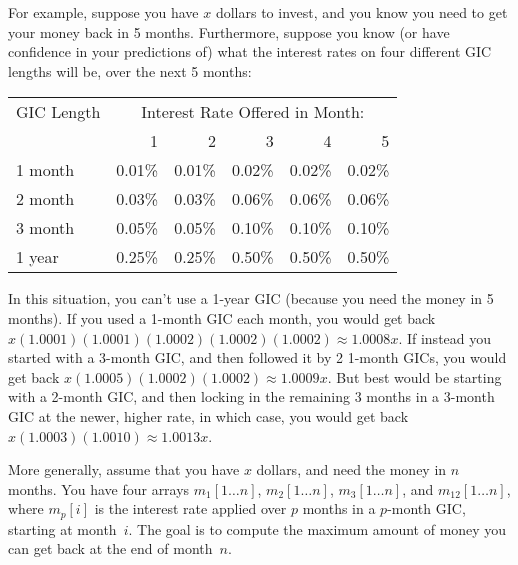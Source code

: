 \documentclass[11pt]{article}
\begin{document}
For example, suppose you have $x$ dollars to invest, and you know you need to
get your money back in 5 months.  Furthermore,
suppose you know (or have confidence in your predictions of) what
the interest rates on four different GIC lengths will be, over the next
5 months:
\begin{center}
\begin{tabular}{l||r|r|r|r|r}
GIC Length & \multicolumn{5}{c}{Interest Rate Offered in Month:} \\
	\cline{2-6}
 & 1 & 2 & 3 & 4 & 5 \\
 \hline
 \hline
1 month & 0.01\% & 0.01\% & 0.02\% & 0.02\% & 0.02\% \\
\hline
2 month & 0.03\% & 0.03\% & 0.06\% & 0.06\% & 0.06\% \\
\hline
3 month & 0.05\% & 0.05\% & 0.10\% & 0.10\% & 0.10\% \\
\hline
1 year & 0.25\% & 0.25\% & 0.50\% & 0.50\% & 0.50\% \\
\hline
\end{tabular}
\end{center}
In this situation, you can't use a 1-year GIC (because you need the money
in 5 months).  If you used a 1-month GIC each month,
you would get back $x(1.0001)(1.0001)(1.0002)(1.0002)(1.0002)\approx 1.0008x$.
If instead you started with a 3-month GIC, and then followed it by 2
1-month GICs,
you would get back $x(1.0005)(1.0002)(1.0002)\approx 1.0009x$.
But best would be starting with a 2-month GIC, and then locking in the
remaining 3 months in a 3-month GIC at the newer, higher rate, in which case,
you would get back $x(1.0003)(1.0010)\approx 1.0013x$.

More generally, assume that you have $x$ dollars, and need the money
in $n$ months.  You have four arrays $m_1[1\ldots n]$, $m_2[1\ldots n]$,
$m_3[1\ldots n]$, and $m_{12}[1\ldots n]$, where $m_p[i]$ is the interest
rate applied over $p$ months in a $p$-month GIC, starting at month~$i$.
The goal is to compute the maximum amount of money you can get back
at the end of month~$n$.
\end{document}
